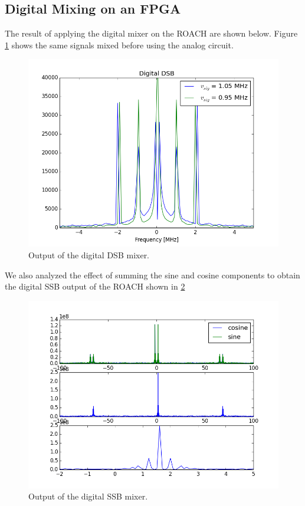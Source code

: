 \documentclass{article}
\begin{document}
  \subsection{Digital Mixing on an FPGA}
  The result of applying the digital mixer on the ROACH are shown below.  Figure \ref{fig:digital_dsb} shows the same signals mixed before using the analog circuit.
  
\begin{figure}[h!]
\centering
\includegraphics[scale=0.7]{digital_mix.png}
\caption{Output of the digital DSB mixer.}
\label{fig:digital_dsb}
\end{figure}

  We also analyzed the effect of summing the sine and cosine components to obtain the digital SSB output of the ROACH shown in \ref{fig:digital_ssb} 
\begin{figure}[h!]
\centering
\includegraphics[scale=0.7]{ssb.png}
\caption{Output of the digital SSB mixer.}
\label{fig:digital_ssb}
\end{figure}
\end{document}
